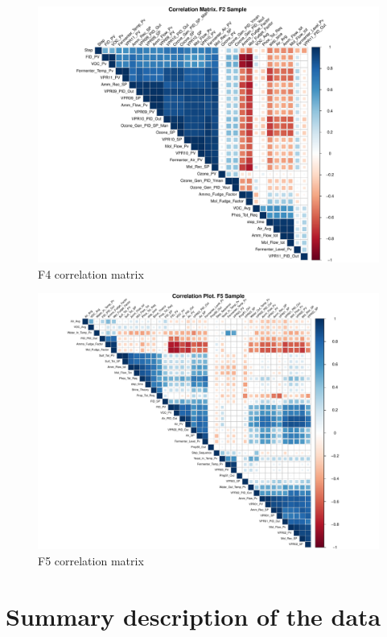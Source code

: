 \begin{figure}[ht]
    \centering
    \includegraphics[width=1\textwidth]{plots/f4_correlation.pdf}
    \caption{F4 correlation matrix}
    \label{fig:f4_correlation}
\end{figure}

\begin{figure}[ht]
    \centering
    \includegraphics[width=1\textwidth]{plots/f5_sample_correlation.pdf}
    \caption{F5 correlation matrix}
    \label{fig:f5_correlation}
\end{figure}

\clearpage

\section{Summary description of the data}


